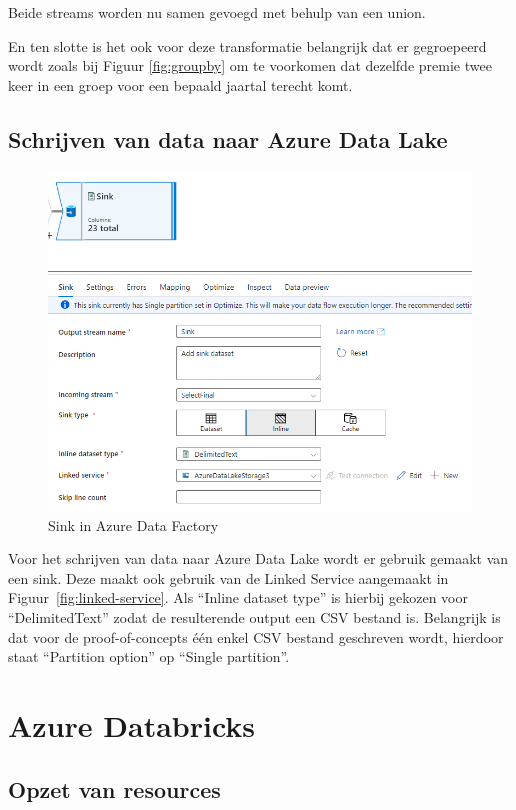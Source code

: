 Beide streams worden nu samen gevoegd met behulp van een union.

En ten slotte is het ook voor deze transformatie belangrijk dat er gegroepeerd wordt zoals bij Figuur \ref{fig:groupby} om te voorkomen dat dezelfde premie twee keer in een groep voor een bepaald jaartal terecht komt.

\subsection{Schrijven van data naar Azure Data Lake}

\begin{figure}[H]
    \includegraphics[width=1\textwidth]{./graphics/adf/sink.png}
    \caption{Sink in Azure Data Factory}
\end{figure}

Voor het schrijven van data naar Azure Data Lake wordt er gebruik gemaakt van een sink. Deze maakt ook gebruik van de Linked Service aangemaakt in Figuur~\ref{fig:linked-service}. Als ``Inline dataset type'' is hierbij gekozen voor ``DelimitedText'' zodat de resulterende output een CSV bestand is. Belangrijk is dat voor de proof-of-concepts één enkel CSV bestand geschreven wordt, hierdoor staat ``Partition option'' op ``Single partition''. 

\section{Azure Databricks}

\subsection{Opzet van resources}

